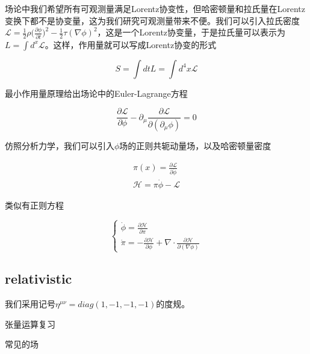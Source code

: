 场论中我们希望所有可观测量满足Lorentz协变性，但哈密顿量和拉氏量在Lorentz变换下都不是协变量，这为我们研究可观测量带来不便。我们可以引入拉氏密度$\mathcal{L}=\frac{1}{2}\rho\bigl(\frac{\partial\phi}{\partial t}\bigr)^2-\frac{1}{2}\tau(\nabla\phi)^2$，这是一个Lorentz协变量，于是拉氏量可以表示为$L=\int d^x \mathcal{L}$。这样，作用量就可以写成Lorentz协变的形式

\begin{equation}
    S=\int dtL=\int d^4x\mathcal{L}
\end{equation}

最小作用量原理给出场论中的Euler-Lagrange方程

\begin{equation}
    \frac{\partial\mathcal{L}}{\partial\phi}-\partial_\mu\frac{\partial\mathcal{L}}{\partial(\partial_\mu\phi)}=0
\end{equation}

仿照分析力学，我们可以引入$\phi$场的正则共轭动量场，以及哈密顿量密度

\begin{equation}
    \begin{split}
        \pi(x)=\frac{\partial\mathcal{L}}{\partial\dot{\phi}} \\
        \mathcal{H}=\pi\dot{\phi}-\mathcal{L}
    \end{split}
\end{equation}

类似有正则方程

\begin{equation}
    \left\{
        \begin{array}{lr}
            \dot{\phi}=\frac{\partial\mathcal{H}}{\partial\pi} \\
            \dot{\pi}=-\frac{\partial\mathcal{H}}{\partial\phi}+\nabla\cdot\frac{\partial\mathcal{H}}{\partial(\nabla\phi)}
        \end{array}
    \right.
\end{equation}



\subsection{relativistic}

我们采用记号$\eta^{\mu\nu}=diag(1,-1,-1,-1)$的度规。

张量运算复习





常见的场

